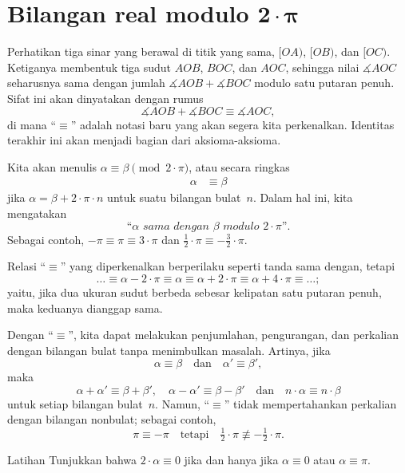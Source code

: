\section[\texorpdfstring{Bilangan real modulo $2\cdot\pi$}{Bilangan real modulo 2·π}]{Bilangan real modulo $\bm{2\cdot\pi}$}



Perhatikan tiga sinar yang berawal di titik yang sama, $[O A)$, $[O B)$, dan $[O C)$.
Ketiganya membentuk tiga sudut $A O B$, $B O C$, dan $A O C$,
sehingga nilai $\measuredangle A O C$ seharusnya sama dengan
jumlah $\measuredangle A O B+\measuredangle B O C$ modulo satu putaran penuh.
Sifat ini akan dinyatakan dengan rumus 
$$\measuredangle A O B+\measuredangle B O C\equiv \measuredangle A O C,$$
di mana ``$\equiv$'' adalah notasi baru yang akan segera kita perkenalkan.
Identitas terakhir ini akan menjadi bagian dari aksioma-aksioma.

Kita akan menulis $\alpha\equiv\beta\pmod{2\cdot\pi}$, atau secara ringkas
\begin{align*}
\alpha&\equiv\beta
\end{align*}
jika $\alpha=\beta+2\cdot\pi\cdot n$
untuk suatu bilangan bulat~$n$.
Dalam hal ini, kita mengatakan 
$$\textit{``$\alpha$ sama dengan $\beta$ modulo $2\cdot\pi$''}.$$
Sebagai contoh, $-\pi
\equiv
\pi\equiv 3\cdot\pi$ dan $\tfrac12\cdot\pi
\equiv
-\tfrac32\cdot\pi$.

Relasi ``$\equiv$'' yang diperkenalkan berperilaku seperti tanda sama dengan,
tetapi
\[\dots\equiv\alpha-2\cdot\pi\equiv \alpha\equiv \alpha+2\cdot\pi\equiv \alpha+4\cdot\pi\equiv\dots;\] 
yaitu, jika dua ukuran sudut berbeda sebesar kelipatan satu putaran penuh,
maka keduanya dianggap sama.

Dengan ``$\equiv$'', kita dapat melakukan penjumlahan, pengurangan, dan perkalian dengan bilangan bulat tanpa menimbulkan masalah.
Artinya, jika
$$\alpha\equiv\beta
\quad
\text{dan}
\quad
\alpha'\equiv \beta',$$ 
maka
$$\alpha+\alpha'\equiv\beta+\beta',
\quad
\alpha-\alpha'\equiv \beta-\beta'
\quad 
\text{dan}
\quad
n\cdot\alpha\equiv n\cdot\beta$$
untuk setiap bilangan bulat~$n$.
Namun, ``$\equiv$'' tidak mempertahankan perkalian dengan bilangan nonbulat; sebagai contoh, 
$$\pi
\equiv 
-\pi
\quad
\text{tetapi}
\quad
\tfrac12\cdot\pi
\not\equiv
-\tfrac12\cdot\pi.$$ 

\begin{thm}[!]{Latihan}\label{ex:2a=0}
Tunjukkan bahwa $2\cdot\alpha\equiv0$ jika dan hanya jika $\alpha\equiv0$ atau $\alpha\equiv\pi$.
\end{thm}

